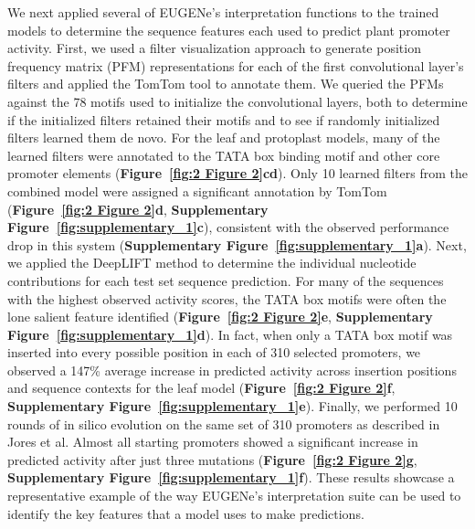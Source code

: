 We next applied several of EUGENe’s interpretation functions to the trained models to determine the sequence features each used to predict plant promoter activity. First, we used a filter visualization approach\cite{Minnoye2020-vz} to generate position frequency matrix (PFM) representations for each of the first convolutional layer’s filters and applied the TomTom\cite{Gupta2007-zw} tool to annotate them. We queried the PFMs against the 78 motifs used to initialize the convolutional layers, both to determine if the initialized filters retained their motifs and to see if randomly initialized filters learned them de novo. For the leaf and protoplast models, many of the learned filters were annotated to the TATA box binding motif and other core promoter elements (\textbf{Figure~\ref{fig:2 Figure 2}c}\textbf{d}). Only 10 learned filters from the combined model were assigned a significant annotation by TomTom (\textbf{Figure~\ref{fig:2 Figure 2}d}, \textbf{Supplementary Figure~\ref{fig:supplementary_1}c}), consistent with the observed performance drop in this system (\textbf{Supplementary Figure~\ref{fig:supplementary_1}a}). Next, we applied the DeepLIFT method\cite{Shrikumar2016-lf} to determine the individual nucleotide contributions for each test set sequence prediction. For many of the sequences with the highest observed activity scores, the TATA box motifs were often the lone salient feature identified (\textbf{Figure~\ref{fig:2 Figure 2}e}, \textbf{Supplementary Figure~\ref{fig:supplementary_1}d}). In fact, when only a TATA box motif was inserted into every possible position in each of 310 selected promoters, we observed a 147\% average increase in predicted activity across insertion positions and sequence contexts for the leaf model (\textbf{Figure~\ref{fig:2 Figure 2}f}, \textbf{Supplementary Figure~\ref{fig:supplementary_1}e}). Finally, we performed 10 rounds of in silico evolution on the same set of 310 promoters as described in Jores et al. Almost all starting promoters showed a significant increase in predicted activity after just three mutations (\textbf{Figure~\ref{fig:2 Figure 2}g}, \textbf{Supplementary Figure~\ref{fig:supplementary_1}f}). These results showcase a representative example of the way EUGENe’s interpretation suite can be used to identify the key features that a model uses to make predictions.

